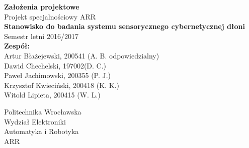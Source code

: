 \documentclass[a4paper,12pt]{article}
\begin{document}
\begin{titlepage}
\begin{center}
\vspace*{1cm}
{ \Large \textbf{ Założenia projektowe }}\\[1cm]


{ \Large Projekt specjalnościowy ARR \\
\textbf{Stanowisko do badania systemu sensorycznego cybernetycznej dłoni}}\\
Semestr letni 2016/2017\\[2cm]

\Large{
\textbf{Zespół:}}\\
\large {Artur Błażejewski, 200541 (A. B. odpowiedzialny)\\
Dawid Chechelski, 197002(D. C.)\\
Paweł Jachimowski, 200355 (P. J.)\\
Krzysztof Kwieciński, 200418 (K. K.)\\
Witold Lipieta, 200415 (W. L.)}

\vfill
\Large
Politechnika Wrocławska\\
\large
Wydział Elektroniki\\
Automatyka i Robotyka\\
ARR
\end{center}
\end{titlepage}

\end{document}
